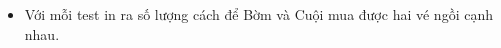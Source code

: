 \begin{itemize}
	\item     Với mỗi test in ra số lượng cách để Bờm và Cuội mua được hai vé ngồi cạnh nhau.   
\end{itemize}